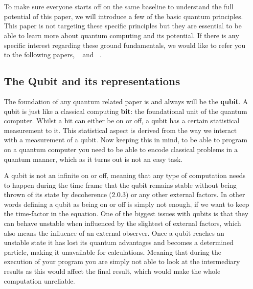 \chapter{}
\label{ch:quantum-essentials}

To make sure everyone starts off on the same baseline to understand the full potential of this paper, we will introduce a few of the basic quantum principles. This paper is not targeting these specific principles but they are essential to be able to learn more about quantum computing and its potential. If there is any specific interest regarding these ground fundamentals, we would like to refer you to the following papers, ~\textcite{Rieffel1998} and ~\textcite{Shor2000}.

\section{The Qubit and its representations}

The foundation of any quantum related paper is and always will be the \textbf{qubit}. A qubit is just like a classical computing \textbf{bit}: the foundational unit of the quantum computer. Whilst a bit can either be on or off, a qubit has a certain statistical measurement to it. This statistical aspect is derived from the way we interact with a measurement of a qubit. Now keeping this in mind, to be able to program on a quantum computer you need to be able to encode classical problems in a quantum manner, which as it turns out is not an easy task.

A qubit is not an infinite on or off, meaning that any type of computation needs to happen during the time frame that the qubit remains stable without being thrown of its state by decoherence (2.0.3) or any other external factors. In other words defining a qubit as being on or off is simply not enough, if we want to keep the time-factor in the equation.
One of the biggest issues with qubits is that they can behave unstable when influenced by the slightest of external factors, which also means the influence of an external observer. Once a qubit reaches an unstable state it has lost its quantum advantages and becomes a determined particle, making it unavailable for calculations. Meaning that during the execution of your program you are simply not able to look at the intermediary results as this would affect the final result, which would make the whole computation unreliable.

